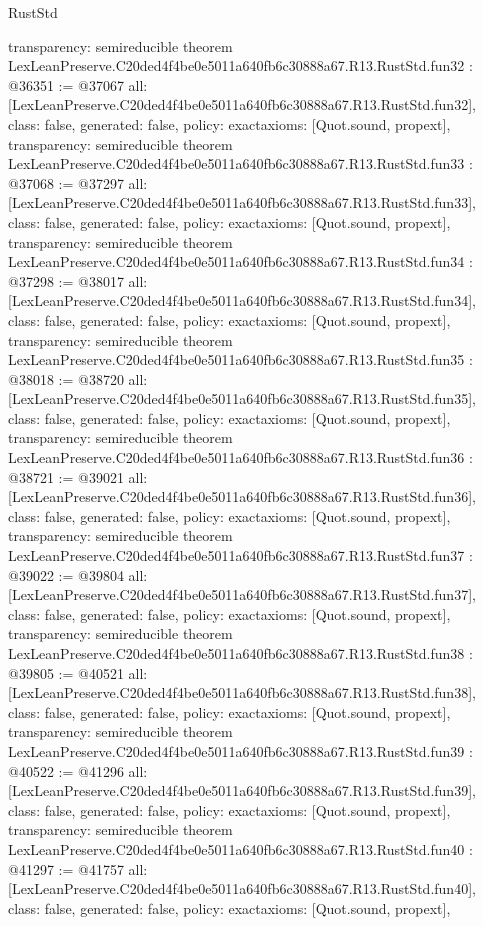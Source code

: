 \begin{lexlean}{RustStd}
\begin{coremodule}
{  transparency: semireducible
}
theorem LexLeanPreserve.C20ded4f4be0e5011a640fb6c30888a67.R13.RustStd.fun32 : @36351 := @37067 {
  all: [LexLeanPreserve.C20ded4f4be0e5011a640fb6c30888a67.R13.RustStd.fun32],
  class: false,
  generated: false,
  policy: exact{axioms: [Quot.sound, propext]},
  transparency: semireducible
}
theorem LexLeanPreserve.C20ded4f4be0e5011a640fb6c30888a67.R13.RustStd.fun33 : @37068 := @37297 {
  all: [LexLeanPreserve.C20ded4f4be0e5011a640fb6c30888a67.R13.RustStd.fun33],
  class: false,
  generated: false,
  policy: exact{axioms: [Quot.sound, propext]},
  transparency: semireducible
}
theorem LexLeanPreserve.C20ded4f4be0e5011a640fb6c30888a67.R13.RustStd.fun34 : @37298 := @38017 {
  all: [LexLeanPreserve.C20ded4f4be0e5011a640fb6c30888a67.R13.RustStd.fun34],
  class: false,
  generated: false,
  policy: exact{axioms: [Quot.sound, propext]},
  transparency: semireducible
}
theorem LexLeanPreserve.C20ded4f4be0e5011a640fb6c30888a67.R13.RustStd.fun35 : @38018 := @38720 {
  all: [LexLeanPreserve.C20ded4f4be0e5011a640fb6c30888a67.R13.RustStd.fun35],
  class: false,
  generated: false,
  policy: exact{axioms: [Quot.sound, propext]},
  transparency: semireducible
}
theorem LexLeanPreserve.C20ded4f4be0e5011a640fb6c30888a67.R13.RustStd.fun36 : @38721 := @39021 {
  all: [LexLeanPreserve.C20ded4f4be0e5011a640fb6c30888a67.R13.RustStd.fun36],
  class: false,
  generated: false,
  policy: exact{axioms: [Quot.sound, propext]},
  transparency: semireducible
}
theorem LexLeanPreserve.C20ded4f4be0e5011a640fb6c30888a67.R13.RustStd.fun37 : @39022 := @39804 {
  all: [LexLeanPreserve.C20ded4f4be0e5011a640fb6c30888a67.R13.RustStd.fun37],
  class: false,
  generated: false,
  policy: exact{axioms: [Quot.sound, propext]},
  transparency: semireducible
}
theorem LexLeanPreserve.C20ded4f4be0e5011a640fb6c30888a67.R13.RustStd.fun38 : @39805 := @40521 {
  all: [LexLeanPreserve.C20ded4f4be0e5011a640fb6c30888a67.R13.RustStd.fun38],
  class: false,
  generated: false,
  policy: exact{axioms: [Quot.sound, propext]},
  transparency: semireducible
}
theorem LexLeanPreserve.C20ded4f4be0e5011a640fb6c30888a67.R13.RustStd.fun39 : @40522 := @41296 {
  all: [LexLeanPreserve.C20ded4f4be0e5011a640fb6c30888a67.R13.RustStd.fun39],
  class: false,
  generated: false,
  policy: exact{axioms: [Quot.sound, propext]},
  transparency: semireducible
}
theorem LexLeanPreserve.C20ded4f4be0e5011a640fb6c30888a67.R13.RustStd.fun40 : @41297 := @41757 {
  all: [LexLeanPreserve.C20ded4f4be0e5011a640fb6c30888a67.R13.RustStd.fun40],
  class: false,
  generated: false,
  policy: exact{axioms: [Quot.sound, propext]},
}
\end{coremodule}
\end{lexlean}

